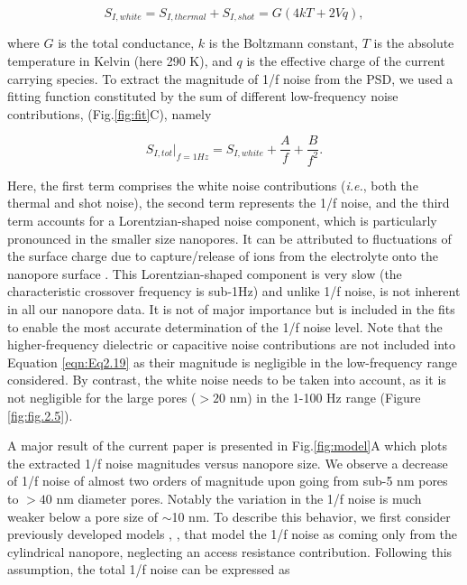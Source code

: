 \begin{equation}\label{eqn:Eq2.18}
S_{I,white}=S_{I,thermal}+S_{I,shot}=G(4kT+2Vq),
\end{equation}                                          

\noindent where $G$ is the total conductance, $k$ is the Boltzmann constant, $T$ is the absolute temperature in Kelvin (here 290 K), and $q$ is the effective charge of the current carrying species. To extract the magnitude of 1/f noise from the PSD, we used a fitting function constituted by the sum of different low-frequency noise contributions, (Fig.\ref{fig:fit}C), namely


\begin{equation}\label{eqn:Eq2.19}
S_{I,tot}|_{f=1Hz}=S_{I,white}+\frac{A}{f}+\frac{B}{f^2}.
\end{equation} 


\noindent Here, the first term comprises the white noise contributions (\emph{i.e.}, both the thermal and shot noise), the second term represents the 1/f noise, and the third term accounts for a Lorentzian-shaped noise component, which is particularly pronounced in the smaller size nanopores. It can be attributed to fluctuations of the surface charge due to capture/release of ions from the electrolyte onto the nanopore surface \cite{Zhang2018,Bezrukov1993,Hoogerheide2009}. This Loren\-tzian-shaped component is very slow (the characteristic crossover frequency is sub-1Hz) and unlike 1/f noise, is not inherent in all our nanopore data. It is not of major importance but is included in the fits to enable the most accurate determination of the 1/f noise level. Note that the higher-frequency dielectric or capacitive noise contributions are not included into Equation \ref{eqn:Eq2.19} as their magnitude is negligible in the low-frequency range considered. By contrast, the white noise needs to be taken into account, as it is not negligible for the large pores ($>20$ nm) in the 1-100 Hz range (Figure \ref{fig:fig.2.5}).


A major result of the current paper is presented in Fig.\ref{fig:model}A which plots the extracted 1/f noise magnitudes versus nanopore size. We observe a decrease of 1/f noise of almost two orders of magnitude upon going from sub-5 nm pores to $>40$ nm diameter pores. Notably the variation in the 1/f noise is much weaker below a pore size of $\sim$10 nm. To describe this behavior, we first consider previously developed models \cite{Smeets2009}, \cite{Smeets2008}, \cite{Wen2017} that model the 1/f noise as coming only from the cylindrical nanopore, neglecting an access resistance contribution. Following this assumption, the total 1/f noise can be expressed \cite{Wen2017} as


